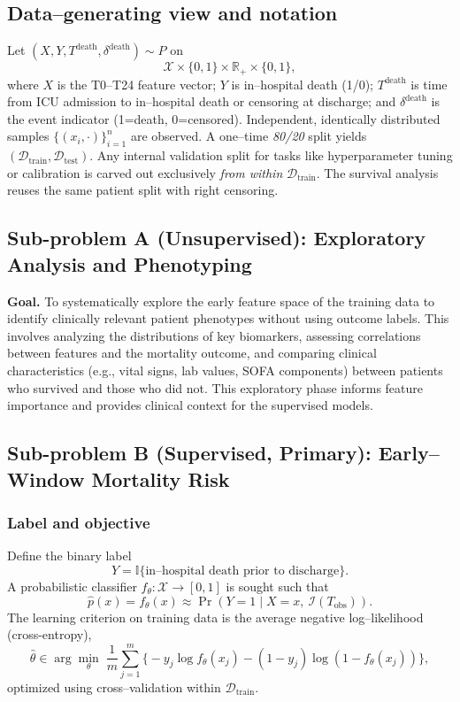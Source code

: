 \subsection{Data–generating view and notation}
Let $(X,Y,T^{\mathrm{death}},\delta^{\mathrm{death}})\sim P$ on
\[
\mathcal{X}\times\{0,1\}\times\mathbb{R}_+\times\{0,1\},
\]
where $X$ is the T0--T24 feature vector; $Y$ is in–hospital death (1/0); $T^{\mathrm{death}}$ is time from ICU admission to in–hospital death or censoring at discharge; and $\delta^{\mathrm{death}}$ is the event indicator (1=death, 0=censored). Independent, identically distributed samples $\{(x_i,\cdot)\}_{i=1}^n$ are observed. A one–time \emph{80/20} split yields $(\mathcal{D}_{\mathrm{train}},\mathcal{D}_{\mathrm{test}})$. Any internal validation split for tasks like hyperparameter tuning or calibration is carved out exclusively \emph{from within} $\mathcal{D}_{\mathrm{train}}$. The survival analysis reuses the same patient split with right censoring.

\subsection{Sub-problem A (Unsupervised): Exploratory Analysis and Phenotyping}
\textbf{Goal.} To systematically explore the early feature space of the training data to identify clinically relevant patient phenotypes without using outcome labels. This involves analyzing the distributions of key biomarkers, assessing correlations between features and the mortality outcome, and comparing clinical characteristics (e.g., vital signs, lab values, SOFA components) between patients who survived and those who did not. This exploratory phase informs feature importance and provides clinical context for the supervised models.

\subsection{Sub-problem B (Supervised, Primary): Early–Window Mortality Risk}
\subsubsection{Label and objective}
Define the binary label
\[
Y=\mathbb{I}\{\text{in–hospital death prior to discharge}\}.
\]
A probabilistic classifier $f_{\theta}:\mathcal{X}\to[0,1]$ is sought such that
\[
\hat p(x)=f_{\theta}(x)\approx \Pr(Y=1\mid X=x,\ \mathcal{I}(T_{\mathrm{obs}})).
\]
The learning criterion on training data is the average negative log–likelihood (cross-entropy),
\[
\hat\theta\in\arg\min_{\theta}\;\frac{1}{m}\sum_{j=1}^{m}
\big\{-y_j\log f_{\theta}(x_j)-(1-y_j)\log(1-f_{\theta}(x_j))\big\},
\]
optimized using cross–validation within $\mathcal{D}_{\mathrm{train}}$.


